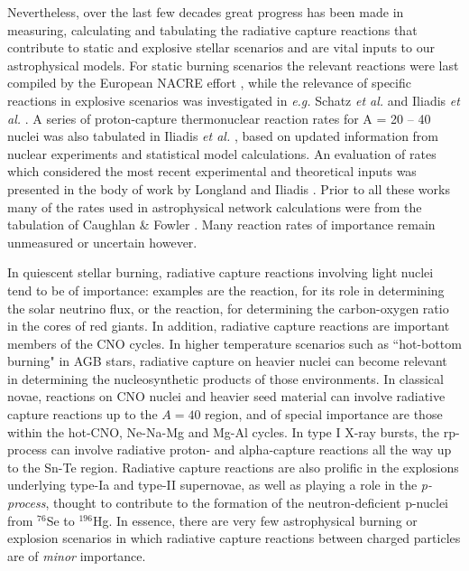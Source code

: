 Nevertheless, over the last few decades great progress has been made in measuring, calculating and tabulating the radiative capture reactions that contribute to static and explosive stellar scenarios and are vital inputs to our astrophysical models.  For static burning scenarios the relevant reactions were last compiled by the European NACRE effort \cite{angu99}, while the relevance of specific reactions in explosive scenarios was investigated in {\it e.g.} Schatz {\it et al.} \cite{scha98} and Iliadis {\it et al.} \cite{ilia02}. A series of proton-capture thermonuclear reaction rates for A = 20 -- 40 nuclei was also tabulated in Iliadis {\it et al.} \cite{ilia01}, based on updated information from nuclear experiments and statistical model calculations. 
An evaluation of rates which considered the most recent experimental and theoretical inputs was presented in the body of work by Longland and Iliadis \cite{Lon10,Ili10a,Ili10b,Ili10c}.
Prior to all these works many of the rates used in astrophysical network calculations were from the tabulation of Caughlan \& Fowler \cite{caug88}. Many reaction rates of importance remain unmeasured or uncertain however.

In quiescent stellar burning, radiative capture reactions involving light nuclei tend to be of importance: examples are the  reaction, for its role in determining the solar neutrino flux, or the  reaction, for determining the carbon-oxygen ratio in the cores of red giants. In addition, radiative capture reactions are important members of the CNO cycles. 
In higher temperature scenarios such as ``hot-bottom burning" in AGB stars, radiative capture on heavier nuclei can become relevant in determining the nucleosynthetic products of those environments. 
In classical novae, reactions on CNO nuclei and heavier seed material can involve radiative capture reactions up to the $A=40$ region, and of special importance are those within the hot-CNO, Ne-Na-Mg and Mg-Al cycles. In type I X-ray bursts, the rp-process can involve radiative proton- and alpha-capture reactions all the way up to the Sn-Te region. 
Radiative capture reactions are also prolific in the explosions underlying type-Ia and type-II supernovae, as well as playing a role in the {\em p-process}, thought to contribute to the formation of the neutron-deficient p-nuclei from  $^{76}$Se to $^{196}$Hg. In essence, there are very few astrophysical burning or explosion scenarios in which radiative capture reactions between charged particles are of {\em minor} importance.   

